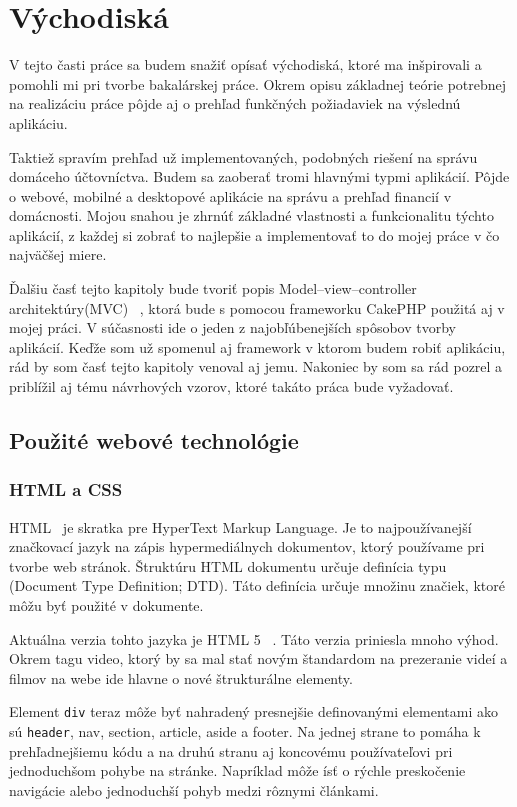 \documentclass[12pt,onesided]{book}
\begin{document}
\chapter{Východiská}\label{chap:background}
V tejto časti práce sa budem snažiť opísať východiská, ktoré ma inšpirovali a pomohli mi pri tvorbe bakalárskej práce. Okrem opisu základnej teórie potrebnej na realizáciu práce pôjde aj o prehľad funkčných požiadaviek na výslednú aplikáciu.

Taktiež spravím prehľad už implementovaných, podobných riešení na správu domáceho účtovníctva. Budem sa zaoberať tromi hlavnými typmi aplikácií. Pôjde o webové, mobilné a desktopové aplikácie na správu a prehľad financií v domácnosti. Mojou snahou je zhrnúť základné vlastnosti a funkcionalitu týchto aplikácií, z každej si zobrať to najlepšie a implementovať to do mojej práce v čo najväčšej miere.

Ďalšiu časť tejto kapitoly bude tvoriť popis Model–view–controller architektúry(MVC) \cite{UvodMVC}\ , ktorá bude s pomocou frameworku CakePHP použitá aj v mojej práci. V súčasnosti ide o jeden z najobľúbenejších spôsobov tvorby aplikácií. Keďže som už spomenul aj framework v ktorom budem robiť aplikáciu, rád by som časť tejto kapitoly venoval aj jemu.
Nakoniec by som sa rád pozrel a priblížil aj tému návrhových vzorov, ktoré takáto práca bude vyžadovať.\newpage



\section{Použité webové technológie}
\subsection{HTML a CSS}
HTML \cite{HTML}\ je skratka pre HyperText Markup Language. Je to najpoužívanejší značkovací jazyk na zápis hypermediálnych dokumentov, ktorý používame pri tvorbe web stránok. Štruktúru HTML dokumentu určuje definícia typu (Document Type Definition; DTD). Táto definícia určuje množinu značiek, ktoré môžu byť použité v dokumente. 

Aktuálna verzia tohto jazyka je HTML 5 \cite{HTML5}\ . Táto verzia priniesla mnoho výhod. Okrem tagu video, ktorý by sa mal stať novým štandardom na prezeranie videí a filmov na webe ide hlavne o nové štrukturálne elementy.
 
Element \texttt{div} teraz môže byť nahradený presnejšie definovanými elementami ako sú \texttt{header}, nav, section, article, aside a footer. Na jednej strane to pomáha k prehľadnejšiemu kódu a na druhú stranu aj koncovému používateľovi pri jednoduchšom pohybe na stránke. Napríklad môže ísť o rýchle preskočenie navigácie alebo jednoduchší pohyb medzi rôznymi článkami.
\end{document}
